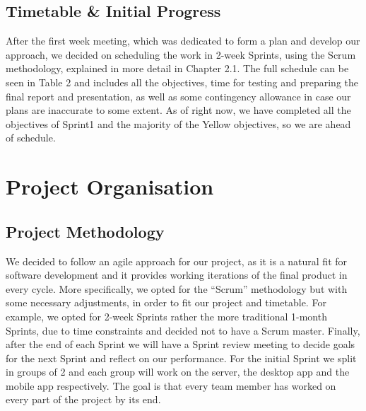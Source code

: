 \documentclass[11pt]{article}
\begin{document}
	\subsection{Timetable \& Initial Progress}
	After the first week meeting, which was dedicated to form a plan and develop our approach, we decided on scheduling the work in 2-week Sprints, using the Scrum methodology, explained in more detail in Chapter 2.1. The full schedule can be seen in Table 2 and includes all the objectives, time for testing and preparing the final report and presentation, as well as some contingency allowance in case our plans are inaccurate to some extent. As of right now, we have completed all the objectives of Sprint1 and the majority of the Yellow objectives, so we are ahead of schedule.\\
	\begin{table}[htb]
	\noindent{}
\caption{Project Timetable}
\end{table}
\section{Project Organisation}
	\subsection{Project Methodology}
	We decided to follow an agile approach for our project, as it is a natural fit for software development and it provides working iterations of the final product in every cycle. More specifically, we opted for the “Scrum” methodology but with some necessary adjustments, in order to fit our project and timetable. For example, we opted for 2-week Sprints rather the more traditional 1-month Sprints, due to time constraints and decided not to have a Scrum master. Finally, after the end of each Sprint we will have a Sprint review meeting to decide goals for the next Sprint and reflect on our performance. For the initial Sprint we split in groups of 2 and each group will work on the server, the desktop app and the mobile app respectively. The goal is that every team member has worked on every part of the project by its end.
\end{document}
